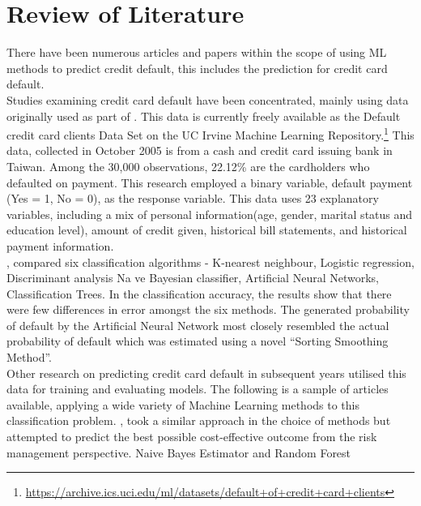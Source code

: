 \documentclass[
]{article}
\author{}
\date{\vspace{-2.5em}}
\begin{document}

\hypertarget{review-of-literature}{%
\section{Review of Literature}\label{review-of-literature}}

There have been numerous articles and papers within the scope of using
ML methods to predict credit default, this includes the prediction for
credit card default.\\
\vspace{.3 cm} Studies examining credit card default have been
concentrated, mainly using data originally used as part of
\citet{YEH20092473}. This data is currently freely available as the
Default credit card clients Data Set on the UC Irvine Machine Learning
Repository.\footnote{\url{https://archive.ics.uci.edu/ml/datasets/default+of+credit+card+clients}}
This data, collected in October 2005 is from a cash and credit card
issuing bank in Taiwan. Among the 30,000 observations, 22.12\% are the
cardholders who defaulted on payment. This research employed a binary
variable, default payment (Yes = 1, No = 0), as the response variable.
This data uses 23 explanatory variables, including a mix of personal
information(age, gender, marital status and education level), amount of
credit given, historical bill statements, and historical payment
information.\\
\vspace{.3 cm} \citet{YEH20092473}, compared six classification
algorithms - K-nearest neighbour, Logistic regression, Discriminant
analysis Na ve Bayesian classifier, Artificial Neural Networks,
Classification Trees. In the classification accuracy, the results show
that there were few differences in error amongst the six methods. The
generated probability of default by the Artificial Neural Network most
closely resembled the actual probability of default which was estimated
using a novel ``Sorting Smoothing Method''.\\
\vspace{.3 cm} Other research on predicting credit card default in
subsequent years utilised this data for training and evaluating models.
The following is a sample of articles available, applying a wide variety
of Machine Learning methods to this classification problem.
\citet{Neema2017TheCO}, took a similar approach in the choice of methods
but attempted to predict the best possible cost-effective outcome from
the risk management perspective. Naive Bayes Estimator and Random Forest
\end{document}
